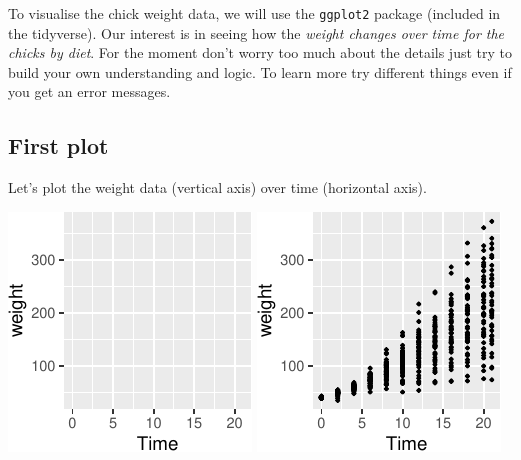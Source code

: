 \documentclass[a4paper,9pt,twocolumn,twoside,printwatermark=false]{pinp}
\begin{document}
To visualise the chick weight data, we will use the \texttt{ggplot2}
package (included in the tidyverse). Our interest is in seeing how the
\emph{weight changes over time for the chicks by diet}. For the moment
don't worry too much about the details just try to build your own
understanding and logic. To learn more try different things even if you
get an error messages.

\subsection{First plot}\label{first-plot}

Let's plot the weight data (vertical axis) over time (horizontal axis).

\begin{Shaded}
\begin{Highlighting}[]
\OperatorTok{+}\StringTok{ }\NormalTok{() }
\end{Highlighting}
\end{Shaded}

\begin{center}\includegraphics{Getting-Started-in-R_files/figure-latex/emptyPlot-1} \includegraphics{Getting-Started-in-R_files/figure-latex/emptyPlot-2} \end{center}
\end{document}
